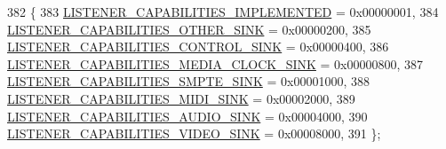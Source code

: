 \begin{DoxyCode}
382 \{
383     \hyperlink{namespaceavdecc__lib_a33513c6f04512c43c67fb5f990c10655ae411ea6af800023a0490c123486b5ff4}{LISTENER\_CAPABILITIES\_IMPLEMENTED} = 0x00000001,
384     \hyperlink{namespaceavdecc__lib_a33513c6f04512c43c67fb5f990c10655a9fde1c1e01e85cc6ebed6f7b7fbdf6da}{LISTENER\_CAPABILITIES\_OTHER\_SINK} = 0x00000200,
385     \hyperlink{namespaceavdecc__lib_a33513c6f04512c43c67fb5f990c10655a79fe547c0c351ab5b8e0f44b7551fdfe}{LISTENER\_CAPABILITIES\_CONTROL\_SINK} = 0x00000400,
386     \hyperlink{namespaceavdecc__lib_a33513c6f04512c43c67fb5f990c10655ad48535bf6ad024caf162493904acdf0c}{LISTENER\_CAPABILITIES\_MEDIA\_CLOCK\_SINK} = 0x00000800,
387     \hyperlink{namespaceavdecc__lib_a33513c6f04512c43c67fb5f990c10655a46d00689710af604cba0517e4a63a239}{LISTENER\_CAPABILITIES\_SMPTE\_SINK} = 0x00001000,
388     \hyperlink{namespaceavdecc__lib_a33513c6f04512c43c67fb5f990c10655abf4582758cc580861006c0bf61af992e}{LISTENER\_CAPABILITIES\_MIDI\_SINK} = 0x00002000,
389     \hyperlink{namespaceavdecc__lib_a33513c6f04512c43c67fb5f990c10655a7a70893f7bfdd82558d2f7d535b87307}{LISTENER\_CAPABILITIES\_AUDIO\_SINK} = 0x00004000,
390     \hyperlink{namespaceavdecc__lib_a33513c6f04512c43c67fb5f990c10655a6f05773e1ac93968146dc84808051271}{LISTENER\_CAPABILITIES\_VIDEO\_SINK} = 0x00008000,
391 \};
\end{DoxyCode}
